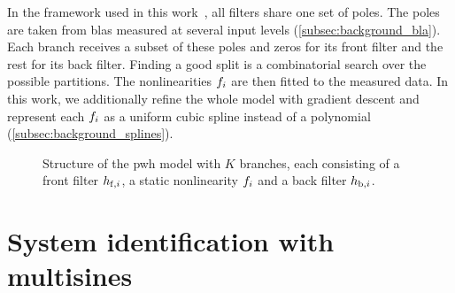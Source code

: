 In the framework used in this work~\cite{pwh_pa_code}, all filters share one set of poles. The poles are taken from \glspl{bla} measured at several input levels (\cref{subsec:background_bla}). Each branch receives a subset of these poles and zeros for its front filter and the rest for its back filter. Finding a good split is a combinatorial search over the possible partitions. The nonlinearities $f\sb{i}$ are then fitted to the measured data. In this work, we additionally refine the whole model with gradient descent and represent each $f\sb{i}$ as a uniform cubic spline instead of a polynomial (\cref{subsec:background_splines}).

\begin{figure}[htbp]
  \centering
  \caption{Structure of the \gls{pwh} model with $K$ branches, each consisting of a front filter $h\sb{\mathrm{f},i}$, a static nonlinearity $f\sb{i}$ and a back filter $h\sb{\mathrm{b},i}$.}
  \label{fig:pwh_structure}
\end{figure}
\section{System identification with multisines}
\label{sec:background_identification}

